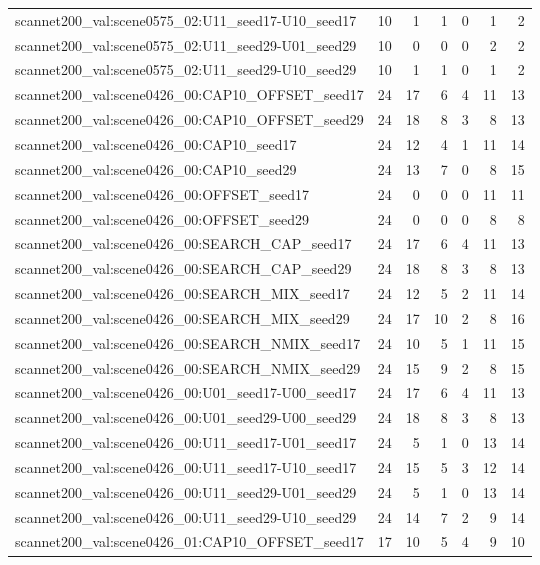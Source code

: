 \begin{table}[t]
\begin{tabular}{lrrrrrr}
scannet200\_val:scene0575\_02:U11\_seed17-U10\_seed17 & 10 & 1 & 1 & 0 & 1 & 2 \\
scannet200\_val:scene0575\_02:U11\_seed29-U01\_seed29 & 10 & 0 & 0 & 0 & 2 & 2 \\
scannet200\_val:scene0575\_02:U11\_seed29-U10\_seed29 & 10 & 1 & 1 & 0 & 1 & 2 \\
scannet200\_val:scene0426\_00:CAP10\_OFFSET\_seed17 & 24 & 17 & 6 & 4 & 11 & 13 \\
scannet200\_val:scene0426\_00:CAP10\_OFFSET\_seed29 & 24 & 18 & 8 & 3 & 8 & 13 \\
scannet200\_val:scene0426\_00:CAP10\_seed17 & 24 & 12 & 4 & 1 & 11 & 14 \\
scannet200\_val:scene0426\_00:CAP10\_seed29 & 24 & 13 & 7 & 0 & 8 & 15 \\
scannet200\_val:scene0426\_00:OFFSET\_seed17 & 24 & 0 & 0 & 0 & 11 & 11 \\
scannet200\_val:scene0426\_00:OFFSET\_seed29 & 24 & 0 & 0 & 0 & 8 & 8 \\
scannet200\_val:scene0426\_00:SEARCH\_CAP\_seed17 & 24 & 17 & 6 & 4 & 11 & 13 \\
scannet200\_val:scene0426\_00:SEARCH\_CAP\_seed29 & 24 & 18 & 8 & 3 & 8 & 13 \\
scannet200\_val:scene0426\_00:SEARCH\_MIX\_seed17 & 24 & 12 & 5 & 2 & 11 & 14 \\
scannet200\_val:scene0426\_00:SEARCH\_MIX\_seed29 & 24 & 17 & 10 & 2 & 8 & 16 \\
scannet200\_val:scene0426\_00:SEARCH\_NMIX\_seed17 & 24 & 10 & 5 & 1 & 11 & 15 \\
scannet200\_val:scene0426\_00:SEARCH\_NMIX\_seed29 & 24 & 15 & 9 & 2 & 8 & 15 \\
scannet200\_val:scene0426\_00:U01\_seed17-U00\_seed17 & 24 & 17 & 6 & 4 & 11 & 13 \\
scannet200\_val:scene0426\_00:U01\_seed29-U00\_seed29 & 24 & 18 & 8 & 3 & 8 & 13 \\
scannet200\_val:scene0426\_00:U11\_seed17-U01\_seed17 & 24 & 5 & 1 & 0 & 13 & 14 \\
scannet200\_val:scene0426\_00:U11\_seed17-U10\_seed17 & 24 & 15 & 5 & 3 & 12 & 14 \\
scannet200\_val:scene0426\_00:U11\_seed29-U01\_seed29 & 24 & 5 & 1 & 0 & 13 & 14 \\
scannet200\_val:scene0426\_00:U11\_seed29-U10\_seed29 & 24 & 14 & 7 & 2 & 9 & 14 \\
scannet200\_val:scene0426\_01:CAP10\_OFFSET\_seed17 & 17 & 10 & 5 & 4 & 9 & 10 \\

\end{tabular}
\end{table}
